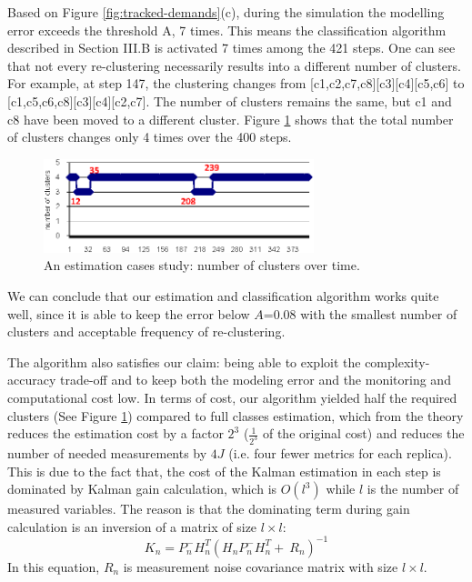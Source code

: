 Based on Figure \ref{fig:tracked-demands}(c), during the simulation the modelling error exceeds the threshold A, 7 times. This means the classification algorithm described in Section III.B is activated 7 times among the 421 steps. One can see that not every re-clustering necessarily results into a different number of clusters. For example, at step 147, the clustering changes from [c1,c2,c7,c8][c3][c4][c5,c6] to [c1,c5,c6,c8][c3][c4][c2,c7]. The number of clusters remains the same, but c1 and c8 have been moved to a different cluster. Figure \ref{fig:number-clusters-over-time} shows that the total number of clusters changes only 4 times over the 400 steps.
\begin{figure}[h]
	\centering
	\includegraphics[width=0.7\textwidth]{image/number-clusters-versus-simulation-steps.eps}
	\caption[An estimation cases study: number of clusters over time.]{An estimation cases study: number of clusters over time.}
	\label{fig:number-clusters-over-time}
\end{figure}

We can conclude that our estimation and classification algorithm works quite well, since it is able to keep the error below $A$=0.08 with the smallest number of clusters and acceptable frequency of re-clustering. 

The algorithm also satisfies our claim: being able to exploit the complexity-accuracy trade-off and to keep both the modeling error and the monitoring and computational cost low. In terms of cost, our algorithm yielded half the required clusters (See Figure \ref{fig:number-clusters-over-time}) compared to full classes estimation, which from the theory reduces the estimation cost by a factor $2^3$ ($\frac{1}{2^3}$ of the original cost) and reduces the number of needed
measurements by $4J$ (i.e. four fewer metrics for each replica). This is due to the fact that, the cost of the Kalman estimation in each step is dominated by Kalman gain calculation, which is $O(l^3)$ while $l$ is the number of measured variables. The reason is that the dominating term during gain calculation is an inversion of a matrix of size $l\times l$:
\begin{equation}
	K_n=P^-_nH^T_n{(H_nP^-_nH^T_n+\ R_n)}^{-1}
\end{equation} 
In this equation, $R_n$ is measurement noise covariance matrix with size $l\times l$.

